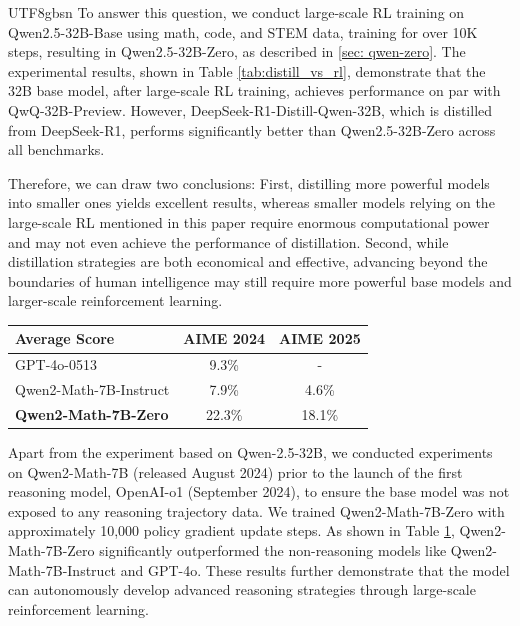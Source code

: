 \documentclass[11pt, a4paper, logo, copyright, nonumbering]{deepseek}
\begin{document}
\begin{CJK*}{UTF8}{gbsn}
To answer this question, we conduct large-scale RL training on Qwen2.5-32B-Base using math, code, and STEM data, training for over 10K steps, resulting in Qwen2.5-32B-Zero, as described in \ref{sec: qwen-zero}. The experimental results, shown in Table \ref{tab:distill_vs_rl}, demonstrate that the 32B base model, after large-scale RL training, achieves performance on par with QwQ-32B-Preview. However, DeepSeek-R1-Distill-Qwen-32B, which is distilled from DeepSeek-R1,  performs significantly better than Qwen2.5-32B-Zero across all benchmarks.

Therefore, we can draw two conclusions: First, distilling more powerful models into smaller ones yields excellent results, whereas smaller models relying on the large-scale RL mentioned in this paper require enormous computational power and may not even achieve the performance of distillation. Second, while distillation strategies are both economical and effective, advancing beyond the boundaries of human intelligence may still require more powerful base models and larger-scale reinforcement learning.

\begin{table}[t]
    \centering
    \begin{tabular}{l|cc} \toprule
    Average Score & 
    \textbf{AIME 2024} & \textbf{AIME 2025} \\
    \midrule
    GPT-4o-0513 & 9.3\% & -  \\
    Qwen2-Math-7B-Instruct & 7.9\% & 4.6\% \\
    \midrule
    \textbf{Qwen2-Math-7B-Zero} & 22.3\% & 18.1\% \\
    \bottomrule
    \end{tabular}
    \label{tab:zero-7b-math}
\end{table}

Apart from the experiment based on Qwen-2.5-32B, we conducted experiments on Qwen2-Math-7B (released August 2024) prior to the launch of the first reasoning model, OpenAI-o1 (September 2024), to ensure the base model was not exposed to any reasoning trajectory data. 
We trained Qwen2-Math-7B-Zero with approximately 10,000 policy gradient update steps. As shown in Table \ref{tab:zero-7b-math}, Qwen2-Math-7B-Zero significantly outperformed the non-reasoning models like Qwen2-Math-7B-Instruct and GPT-4o. These results further demonstrate that the model can autonomously develop advanced reasoning strategies through large-scale reinforcement learning.


\end{CJK*}
\end{document}
